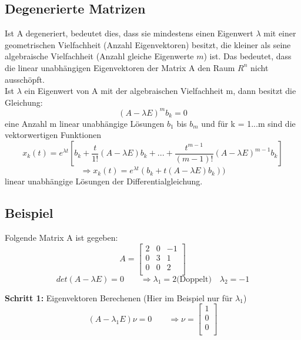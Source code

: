 \subsection{Degenerierte Matrizen}
Ist A degeneriert, bedeutet dies, dass sie mindestens einen Eigenwert $\lambda$ mit einer geometrischen Vielfachheit (Anzahl Eigenvektoren) besitzt, die kleiner als seine algebraische Vielfachheit (Anzahl gleiche Eigenwerte $m$) ist. 
Das bedeutet, dass die linear unabhängigen Eigenvektoren der Matrix A den Raum $R^n$ nicht ausschöpft.\\
Ist $\lambda$ ein Eigenwert von A mit der algebraischen Vielfachheit m, dann besitzt die Gleichung: 
\begin{equation*}
(A-\lambda E)^m b_k = 0
\end{equation*}
eine Anzahl m linear unabhängige Lösungen $b_1$ bis $b_m$ und für k = 1...m sind die vektorwertigen Funktionen
\begin{equation*}
x_k(t) = e^{\lambda t}\left[{b_k + \frac{t}{1!}(A-\lambda E)b_k + ... + \frac{t^{m-1}}{(m-1)!}(A-\lambda E)^{m-1}b_k}\right]
\end{equation*}
\begin{equation*}
 \Longrightarrow x_k(t) = e^{\lambda t}(b_k + t (A-\lambda E) b_k))
\end{equation*}
linear unabhängige Lösungen der Differentialgleichung. 
\subsection{Beispiel}
Folgende Matrix A ist gegeben: 
\begin{equation*}
	A =     
\begin{bmatrix} %
	2 & 0 & -1\\
	0 & 3 & 1\\
	0 & 0 & 2\\
\end{bmatrix}
\end{equation*}
\begin{equation*}
det(A-\lambda E) = 0 \qquad \Longrightarrow \lambda_1 = 2 \text{(Doppelt)} \quad \lambda_2 = -1
\end{equation*}

\textbf{Schritt 1:} Eigenvektoren Berechenen (Hier im Beispiel nur für $\lambda_1$)\\
\begin{equation*}
(A - \lambda_1 E)\nu = 0 \qquad \Longrightarrow \nu = 
\begin{bmatrix} %
	1 \\
	0 \\
	0 \\
\end{bmatrix}
\end{equation*}


